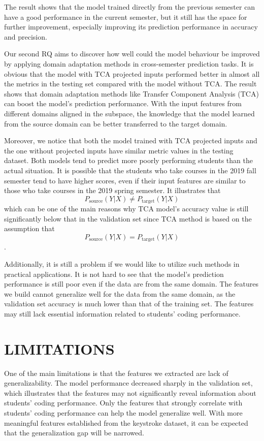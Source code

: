 \documentclass[sigconf,final]{acmart}
\begin{document}
The result shows that the model trained directly from the previous semester can have a good performance in the current semester, but it still has the space for further improvement, especially improving its prediction performance in accuracy and precision.

Our second RQ aims to discover how well could the model behaviour be improved by applying domain adaptation methods in cross-semester prediction tasks. It is obvious that the model with TCA projected inputs performed better in almost all the metrics in the testing set compared with the model without TCA. The result shows that domain adaptation methods like Transfer Component Analysis (TCA) can boost the model’s prediction performance. With the input features from different domains aligned in the subspace, the knowledge that the model learned from the source domain can be better transferred to the target domain.

Moreover, we notice that both the model trained with TCA projected inputs and the one without projected inputs have similar metric values in the testing dataset. Both models tend to predict more poorly performing students than the actual situation. It is possible that the students who take courses in the 2019 fall semester tend to have higher scores, even if their input features are similar to those who take courses in the 2019 spring semester. It illustrates that $$P_{\text{source}}(Y|X) \neq P_{\text{target}}(Y|X)$$ which can be one of the main reasons why TCA model’s accuracy value is still significantly below that in the validation set since TCA method is based on the assumption that$$P_{\text{source}}(Y|X) = P_{\text{target}}(Y|X)$$.

Additionally, it is still a problem if we would like to utilize such methods in practical applications. It is not hard to see that the model’s prediction performance is still poor even if the data are from the same domain. The features we build cannot generalize well for the data from the same domain, as the validation set accuracy is much lower than that of the training set. The features may still lack essential information related to students’ coding performance. 

\section{LIMITATIONS}

One of the main limitations is that the features we extracted are lack of generalizability. The model performance decreased sharply in the validation set, which illustrates that the features may not significantly reveal information about students’ coding performance. Only the features that strongly correlate with students’ coding performance can help the model generalize well. With more meaningful features established from the keystroke dataset, it can be expected that the generalization gap will be narrowed.
\end{document}
